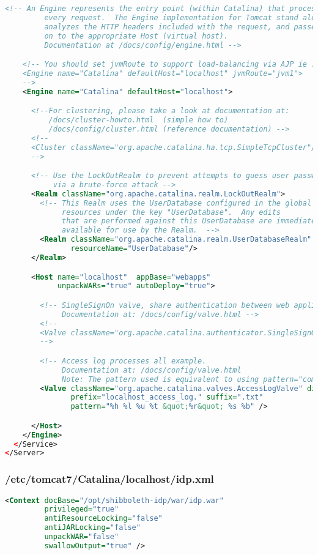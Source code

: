 \begin{lstlisting}[language=xml]
    <!-- An Engine represents the entry point (within Catalina) that processes
         every request.  The Engine implementation for Tomcat stand alone
         analyzes the HTTP headers included with the request, and passes them
         on to the appropriate Host (virtual host).
         Documentation at /docs/config/engine.html -->

    <!-- You should set jvmRoute to support load-balancing via AJP ie :
    <Engine name="Catalina" defaultHost="localhost" jvmRoute="jvm1">
    -->
    <Engine name="Catalina" defaultHost="localhost">

      <!--For clustering, please take a look at documentation at:
          /docs/cluster-howto.html  (simple how to)
          /docs/config/cluster.html (reference documentation) -->
      <!--
      <Cluster className="org.apache.catalina.ha.tcp.SimpleTcpCluster"/>
      -->

      <!-- Use the LockOutRealm to prevent attempts to guess user passwords
           via a brute-force attack -->
      <Realm className="org.apache.catalina.realm.LockOutRealm">
        <!-- This Realm uses the UserDatabase configured in the global JNDI
             resources under the key "UserDatabase".  Any edits
             that are performed against this UserDatabase are immediately
             available for use by the Realm.  -->
        <Realm className="org.apache.catalina.realm.UserDatabaseRealm"
               resourceName="UserDatabase"/>
      </Realm>

      <Host name="localhost"  appBase="webapps"
            unpackWARs="true" autoDeploy="true">

        <!-- SingleSignOn valve, share authentication between web applications
             Documentation at: /docs/config/valve.html -->
        <!--
        <Valve className="org.apache.catalina.authenticator.SingleSignOn" />
        -->

        <!-- Access log processes all example.
             Documentation at: /docs/config/valve.html
             Note: The pattern used is equivalent to using pattern="common" -->
        <Valve className="org.apache.catalina.valves.AccessLogValve" directory="logs"
               prefix="localhost_access_log." suffix=".txt"
               pattern="%h %l %u %t &quot;%r&quot; %s %b" />

      </Host>
    </Engine>
  </Service>
</Server>
\end{lstlisting}

\subsubsection{/etc/tomcat7/Catalina/localhost/idp.xml}
\begin{lstlisting}[language=xml]
<Context docBase="/opt/shibboleth-idp/war/idp.war"
         privileged="true"
         antiResourceLocking="false"
         antiJARLocking="false"
         unpackWAR="false"
         swallowOutput="true" />
\end{lstlisting}

